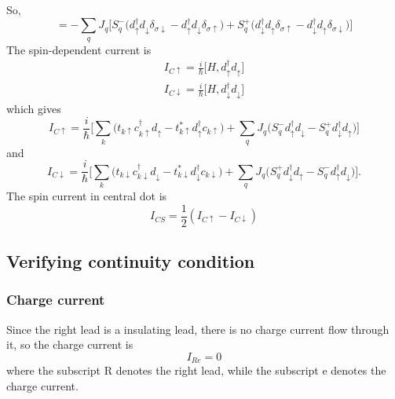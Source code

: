 \documentclass[11pt,a4paper]{article}
\begin{document}
So,
\begin{equation}
[V_{R},  d_{\sigma}^{\dag}d_{\sigma}] =  -\sum_{q}J_{q}\big[ S_{q}^{-} \big( d_{\uparrow}^{\dag}d_{\downarrow}\delta_{\sigma \downarrow} - d_{\uparrow}^{\dag}d_{\downarrow}\delta_{\sigma \uparrow} \big) + S_{q}^{+}\big(d_{\downarrow}^{\dag}d_{\uparrow}\delta_{\sigma \uparrow} - d_{\downarrow}^{\dag}d_{\uparrow}\delta_{\sigma \downarrow} \big)\big]
\end{equation}
The spin-dependent current is
\begin{eqnarray}
I_{C\uparrow} = \frac{i}{\hbar}\big[ H, d_{\uparrow}^{\dag} d_{\uparrow} \big]
\\
I_{C\downarrow} = \frac{i}{\hbar}\big[ H, d_{\downarrow}^{\dag} d_{\downarrow} \big]
\end{eqnarray}
which gives
\begin{equation}
I_{C\uparrow} = \frac{i}{\hbar} \big[ \sum_{k}\big(t_{k\uparrow} c_{k\uparrow}^{\dag}d_{\uparrow} - t_{k\uparrow}^{*} d_{\uparrow}^{\dag}c_{k\uparrow} \big) + \sum_{q}J_{q}\big( S_{q}^{-} d_{\uparrow}^{\dag}d_{\downarrow} - S_{q}^{+}d_{\downarrow}^{\dag}d_{\uparrow} \big)\big]
\end{equation}
and
\begin{equation}
I_{C\downarrow} = \frac{i}{\hbar} \big[ \sum_{k}\big(t_{k\downarrow} c_{k\downarrow}^{\dag}d_{\downarrow} - t_{k\downarrow}^{*} d_{\downarrow}^{\dag}c_{k\downarrow} \big) + \sum_{q}J_{q}\big(S_{q}^{+}d_{\downarrow}^{\dag}d_{\uparrow} -  S_{q}^{-} d_{\uparrow}^{\dag}d_{\downarrow} \big)\big].
\end{equation}
The spin current in central dot is
\begin{equation}
I_{CS} = \frac{1}{2}(I_{C\uparrow} - I_{C\downarrow})
\end{equation}

\subsection{Verifying continuity condition}
\subsubsection{Charge current}
Since the right lead is a insulating lead, there is no charge current flow through it, so the charge current is
\begin{equation}
I_{Re} = 0
\end{equation}
where the subscript R denotes the right lead, while the subscript e denotes the charge current.
\end{document}
